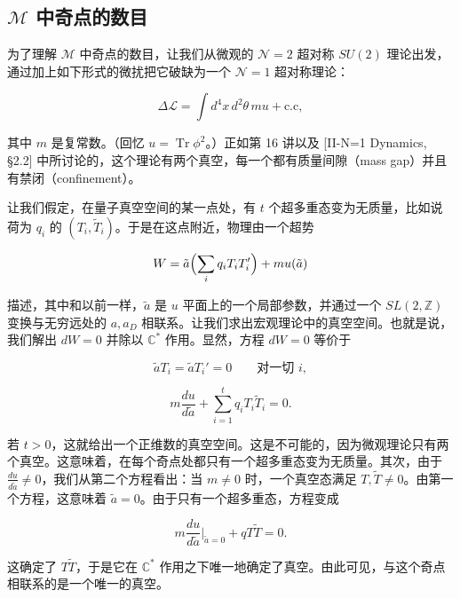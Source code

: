 \subsection{$\mathcal{M}$ 中奇点的数目}

为了理解 $\mathcal{M}$ 中奇点的数目，让我们从微观的 $\mathcal{N}=2$ 超对称 $SU(2)$ 理论出发，通过加上如下形式的微扰把它破缺为一个 $\mathcal{N}=1$ 超对称理论：

\begin{equation}
  \tag{18.7}
  \label{eq:18-7}
  \Delta\mathcal{L}=\int d^4x\,d^2\theta\,mu+\text{c.c},
\end{equation}

其中 $m$ 是复常数。（回忆 $u=\operatorname{Tr}\phi^2$。）正如第 16 讲以及 [II-N=1 Dynamics, §2.2] 中所讨论的，这个理论有两个真空，每一个都有质量间隙（mass gap）并且有禁闭（confinement）。

让我们假定，在量子真空空间的某一点处，有 $t$ 个超多重态变为无质量，比如说荷为 $q_i$ 的 $(T_i,\tilde T_i)$。于是在这点附近，物理由一个超势

\[
  W=\tilde a\Bigl(\sum_i q_iT_iT_i'\Bigr)+mu(\tilde a)
\]

描述，其中和以前一样，$\tilde a$ 是 $u$ 平面上的一个局部参数，并通过一个 $SL(2,\mathbb{Z})$ 变换与无穷远处的 $a,a_D$ 相联系。让我们求出宏观理论中的真空空间。也就是说，我们解出 $dW=0$ 并除以 $\mathbb{C}^*$ 作用。显然，方程 $dW=0$ 等价于

\[
  \tilde aT_i=\tilde aT_i'=0\qquad\text{对一切 }i,
\]

\[
  m\frac{du}{d\tilde a}+\sum_{i=1}^{t}q_iT_i\tilde T_i=0.
\]

若 $t>0$，这就给出一个正维数的真空空间。这是不可能的，因为微观理论只有两个真空。这意味着，在每个奇点处都只有一个超多重态变为无质量。其次，由于 $\frac{du}{d\tilde a}\neq0$，我们从第二个方程看出：当 $m\neq0$ 时，一个真空态满足 $T,\tilde T\neq0$。由第一个方程，这意味着 $\tilde a=0$。由于只有一个超多重态，方程变成

\[
  m\frac{du}{d\tilde a}\Big|_{\tilde a=0}+qT\tilde T=0.
\]

这确定了 $T\tilde T$，于是它在 $\mathbb{C}^*$ 作用之下唯一地确定了真空。由此可见，与这个奇点相联系的是一个唯一的真空。


